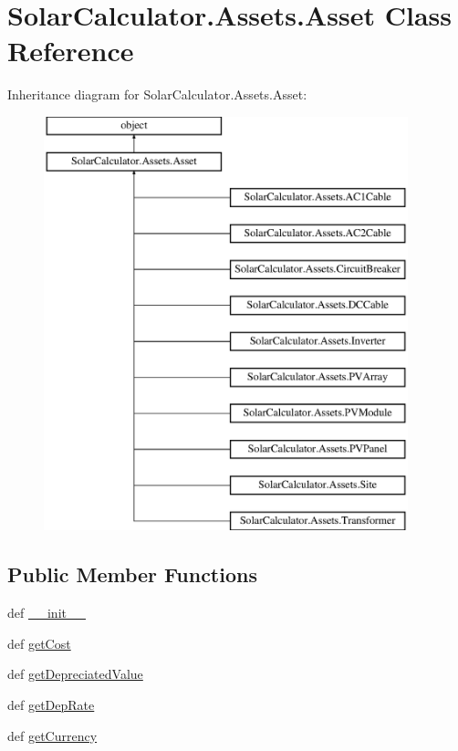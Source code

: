 \hypertarget{class_solar_calculator_1_1_assets_1_1_asset}{\section{Solar\-Calculator.\-Assets.\-Asset Class Reference}
\label{class_solar_calculator_1_1_assets_1_1_asset}
}
Inheritance diagram for Solar\-Calculator.\-Assets.\-Asset\-:\begin{figure}[H]
\begin{center}
\leavevmode
\includegraphics[height=12.000000cm]{class_solar_calculator_1_1_assets_1_1_asset}
\end{center}
\end{figure}
\subsection*{Public Member Functions}
\begin{DoxyCompactItemize}
\item 
def \hyperlink{class_solar_calculator_1_1_assets_1_1_asset_ae7197c816e3eeeb5cd1dfc7e1daab3db}{\-\_\-\-\_\-init\-\_\-\-\_\-}
\item 
def \hyperlink{class_solar_calculator_1_1_assets_1_1_asset_a3e8deb9579fc9b389292f94b31eacf59}{get\-Cost}
\item 
def \hyperlink{class_solar_calculator_1_1_assets_1_1_asset_ad824704e32f98ea39f6fb5ed994c3501}{get\-Depreciated\-Value}
\item 
def \hyperlink{class_solar_calculator_1_1_assets_1_1_asset_a4b73c8b6e7faab79ec1dbd98ca86f41d}{get\-Dep\-Rate}
\item 
def \hyperlink{class_solar_calculator_1_1_assets_1_1_asset_a1acd09eed28a1b5db802f83304633047}{get\-Currency}
\end{DoxyCompactItemize}

